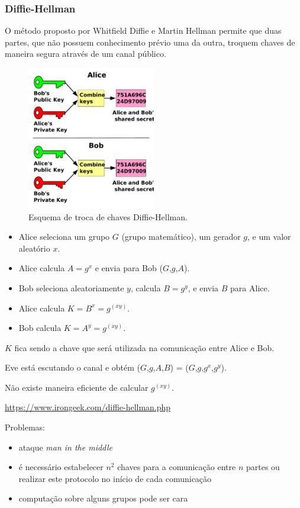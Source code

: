 \begin{frame}[allowframebreaks]
\frametitle{Diffie-Hellman}
O método proposto por Whitfield Diffie e Martin Hellman permite que duas partes,
que não possuem conhecimento prévio uma da outra, troquem chaves de maneira segura através de um canal público.

\begin{figure}[h]
\centering
\includegraphics[width=0.5\textwidth,height=0.5\textheight,keepaspectratio]{figures/public_key_shared_secret.pdf}
\caption{Esquema de troca de chaves Diffie-Hellman.}
\label{fig-diffiehellman}
\end{figure}

\framebreak
\begin{itemize}
\item Alice seleciona um grupo $G$ (grupo matemático), um gerador $g$, e um valor aleatório $x$.
\item Alice calcula $A = g^x$ e envia para Bob ($G$,$g$,$A$).
\item Bob seleciona aleatoriamente $y$, calcula $B = g^y$, e envia $B$ para Alice.
\item Alice calcula $K = B^x= g^{(xy)}$.
\item Bob calcula $K = A^y= g^{(xy)}$.
\end{itemize}

$K$ fica sendo a chave que será utilizada na comunicação entre Alice e Bob.

Eve está escutando o canal e obtém ($G$,$g$,$A$,$B$) = ($G$,$g$,$g^x$,$g^y$).

Não existe maneira eficiente de calcular $g^{(xy)}$.

\vspace{3ex}
\url{https://www.irongeek.com/diffie-hellman.php}


\framebreak
Problemas:
\begin{itemize}
\item ataque \emph{man in the middle}
\item é necessário estabelecer $n^2$ chaves para a comunicação entre $n$ partes ou realizar este protocolo no início de cada comunicação
\item computação sobre alguns grupos pode ser cara
\end{itemize}

\end{frame}


